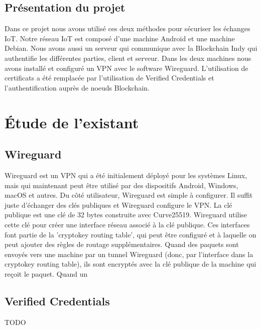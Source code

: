\documentclass[12pt, openany]{report}
\begin{document}
\subsection{Présentation du projet}
\noindent 
\begin{flushleft}
Dans ce projet nous avons utilisé ces deux méthodes pour sécuriser les échanges IoT. Notre réseau IoT est composé d'une machine Android et une machine Debian. Nous avons aussi un serveur qui communique avec la Blockchain Indy qui authentifie les différentes parties, client et serveur. Dans les deux machines nous avons installé et configuré un VPN avec le software Wireguard. L'utilisation de certificats a été remplacée par l'utilisation de Verified Credentials et l'authentification auprès de noeuds Blockchain. \\
\end{flushleft}


\section{Étude de l'existant}

\subsection{Wireguard}
\noindent 
\begin{flushleft}
Wireguard est un VPN qui a été initialement déployé pour les systèmes Linux, mais qui maintenant peut être utilisé par des dispositifs Android, Windows, macOS et autres. Du côté utilisateur, Wireguard est simple à configurer. Il  suffit juste d'échanger des clés publiques et Wireguard configure le VPN. La clé publique est une clé de 32 bytes construite avec Curve25519. Wireguard utilise cette clé pour créer une interface réseau associé à la clé publique. Ces interfaces font partie de la 'cryptokey routing table', qui peut être configuré et à laquelle on peut ajouter des règles de routage supplémentaires. Quand des paquets sont envoyés vers une machine par un tunnel Wireguard (donc, par l'interface dans la cryptokey routing table), ils sont encryptés avec la clé publique de la machine qui reçoit le paquet.
Quand un 
\end{flushleft}

\subsection{Verified Credentials}
\noindent 
\begin{flushleft}
TODO
\end{flushleft}
\end{document}
